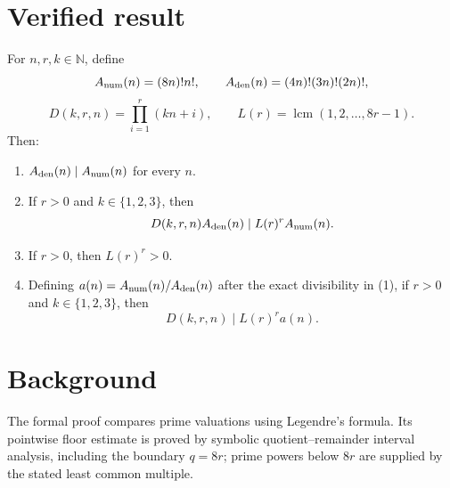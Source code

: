 \documentclass{article}
\begin{document}
\section*{Verified result}
For $n,r,k\in\mathbb N$, define
\[
 A_{\rm num}(n)=(8n)!n!,\qquad
 A_{\rm den}(n)=(4n)!(3n)!(2n)!,
\]
\[
 D(k,r,n)=\prod_{i=1}^{r}(kn+i),\qquad
 L(r)=\operatorname{lcm}(1,2,\ldots,8r-1).
\]
Then:
\begin{enumerate}
\item $A_{\rm den}(n)\mid A_{\rm num}(n)$ for every $n$.
\item If $r>0$ and $k\in\{1,2,3\}$, then
\[
 D(k,r,n)A_{\rm den}(n)\mid L(r)^r A_{\rm num}(n).
\]
\item If $r>0$, then $L(r)^r>0$.
\item Defining $a(n)=A_{\rm num}(n)/A_{\rm den}(n)$ after the exact divisibility in (1), if $r>0$ and $k\in\{1,2,3\}$, then
\[
 D(k,r,n)\mid L(r)^r a(n).
\]
\end{enumerate}

\section*{Background}
The formal proof compares prime valuations using Legendre's formula.  Its pointwise floor estimate is proved by symbolic quotient--remainder interval analysis, including the boundary $q=8r$; prime powers below $8r$ are supplied by the stated least common multiple.
\end{document}
